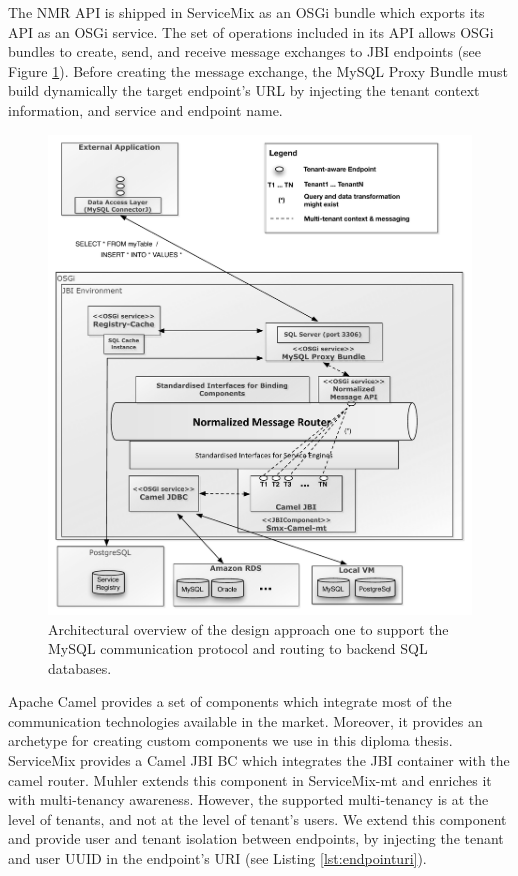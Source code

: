 The \ac{NMR} \ac{API} is shipped in ServiceMix as an \ac{OSGi} bundle which exports its \ac{API} as an \ac{OSGi} service. The set of operations included in its \ac{API} allows \ac{OSGi} bundles to create, send, and receive message exchanges to \ac{JBI} endpoints (see Figure \ref{fig:designsqlapp1}).  Before creating the message exchange, the MySQL Proxy Bundle must build dynamically the target endpoint's URL by injecting the tenant context information, and service and endpoint name.

\begin{figure}[htb]
	\centering
		\includegraphics[clip, scale=0.6]{./gfx/sqlApproach/sqlApproachv2_doc.pdf}
	\caption[SQL Support Approach 1]{Architectural overview of the design approach one to support the MySQL communication protocol and routing to backend \ac{SQL} databases.}
	\label{fig:designsqlapp1}
\end{figure}

Apache Camel provides a set of components which integrate most of the communication technologies available in the market. Moreover, it provides an archetype for creating custom components we use in this diploma thesis. ServiceMix provides a Camel \ac{JBI} \ac{BC} which integrates the \ac{JBI} container with the camel router. Muhler extends this component in ServiceMix-mt and enriches it with multi-tenancy awareness. However, the supported multi-tenancy is at the level of tenants, and not at the level of tenant's users. We extend this component and provide user and tenant isolation between endpoints, by injecting the tenant and user UUID in the endpoint's URI (see Listing \ref{lst:endpointuri}). 

